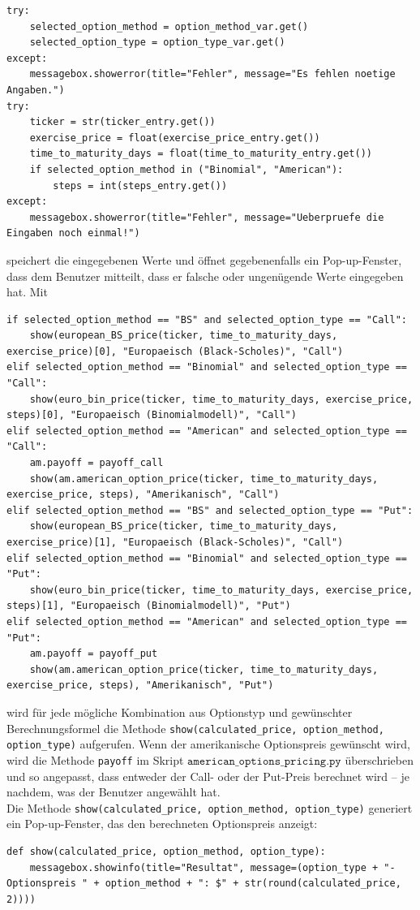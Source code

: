 \documentclass[11pt]{report} %
\begin{document}
\begin{lstlisting}
try:
    selected_option_method = option_method_var.get()
    selected_option_type = option_type_var.get()
except:
    messagebox.showerror(title="Fehler", message="Es fehlen noetige Angaben.")
try:
    ticker = str(ticker_entry.get())
    exercise_price = float(exercise_price_entry.get())
    time_to_maturity_days = float(time_to_maturity_entry.get())
    if selected_option_method in ("Binomial", "American"):
        steps = int(steps_entry.get())
except:
    messagebox.showerror(title="Fehler", message="Ueberpruefe die Eingaben noch einmal!")
\end{lstlisting} speichert die eingegebenen Werte und öffnet gegebenenfalls ein Pop-up-Fenster, dass dem Benutzer mitteilt, dass er falsche oder ungenügende Werte eingegeben hat. Mit \begin{lstlisting}
if selected_option_method == "BS" and selected_option_type == "Call":
    show(european_BS_price(ticker, time_to_maturity_days, exercise_price)[0], "Europaeisch (Black-Scholes)", "Call")
elif selected_option_method == "Binomial" and selected_option_type == "Call":
    show(euro_bin_price(ticker, time_to_maturity_days, exercise_price, steps)[0], "Europaeisch (Binomialmodell)", "Call")
elif selected_option_method == "American" and selected_option_type == "Call":
    am.payoff = payoff_call
    show(am.american_option_price(ticker, time_to_maturity_days, exercise_price, steps), "Amerikanisch", "Call")
elif selected_option_method == "BS" and selected_option_type == "Put":
    show(european_BS_price(ticker, time_to_maturity_days, exercise_price)[1], "Europaeisch (Black-Scholes)", "Call")
elif selected_option_method == "Binomial" and selected_option_type == "Put":
    show(euro_bin_price(ticker, time_to_maturity_days, exercise_price, steps)[1], "Europaeisch (Binomialmodell)", "Put")
elif selected_option_method == "American" and selected_option_type == "Put":
    am.payoff = payoff_put
    show(am.american_option_price(ticker, time_to_maturity_days, exercise_price, steps), "Amerikanisch", "Put")
\end{lstlisting} wird für jede mögliche Kombination aus Optionstyp und gewünschter Berechnungsformel die Methode \texttt{show(calculated\_price, option\_method, option\_type)} aufgerufen. Wenn der amerikanische Optionspreis gewünscht wird, wird die Methode \texttt{payoff} im Skript $\texttt{american\_options\_pricing.py}$ überschrieben und so angepasst, dass entweder der Call- oder der Put-Preis berechnet wird -- je nachdem, was der Benutzer angewählt hat.\\Die Methode \texttt{show(calculated\_price, option\_method, option\_type)} generiert ein Pop-up-Fenster, das den berechneten Optionspreis anzeigt:\begin{lstlisting}
def show(calculated_price, option_method, option_type):
    messagebox.showinfo(title="Resultat", message=(option_type + "-Optionspreis " + option_method + ": $" + str(round(calculated_price, 2))))
\end{lstlisting}
\end{document}
